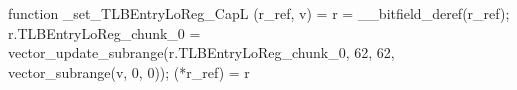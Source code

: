 function _set_TLBEntryLoReg_CapL (r_ref, v) = {
    r = __bitfield_deref(r_ref);
    r.TLBEntryLoReg_chunk_0 = vector_update_subrange(r.TLBEntryLoReg_chunk_0, 62, 62, vector_subrange(v, 0, 0));
    (*r_ref) = r
}
